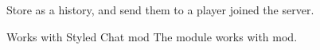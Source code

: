 Store  as a history, and send them to a player joined the server.

\begin{tips}{Works with Styled Chat mod}
    The  module works with  mod.
\end{tips}

